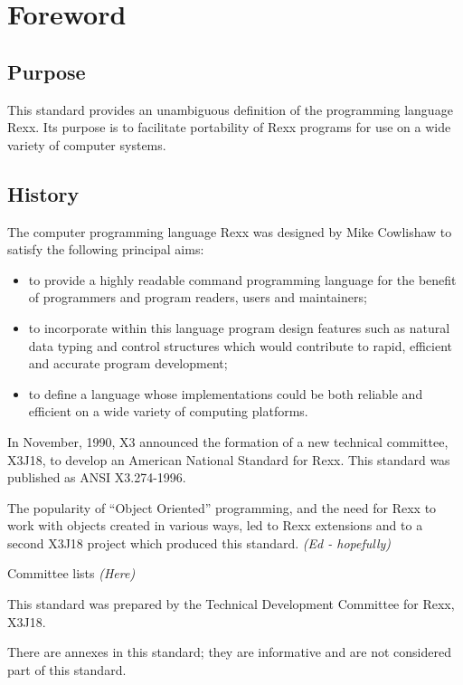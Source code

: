 \chapter{Foreword}\label{foreword}

\section{Purpose}\label{purpose}

This standard provides an unambiguous definition of the programming
language Rexx. Its purpose is to facilitate portability of Rexx programs
for use on a wide variety of computer systems.

\section{History}\label{history}

The computer programming language Rexx was designed by Mike Cowlishaw to
satisfy the following principal aims:

\begin{itemize}
\item
  to provide a highly readable command programming language for the
  benefit of programmers and program readers, users and maintainers;
\item
  to incorporate within this language program design features such as
  natural data typing and control structures which would contribute to
  rapid, efficient and accurate program development;
\item
  to define a language whose implementations could be both reliable and
  efficient on a wide variety of computing platforms.
\end{itemize}

In November, 1990, X3 announced the formation of a new technical
committee, X3J18, to develop an American National Standard for Rexx.
This standard was published as ANSI X3.274-1996.

The popularity of ``Object Oriented'' programming, and the need for Rexx
to work with objects created in various ways, led to Rexx extensions and
to a second X3J18 project which produced this standard. \emph{(Ed -
hopefully)}

Committee lists \emph{(Here)}

This standard was prepared by the Technical Development Committee for
Rexx, X3J18.

There are annexes in this standard; they are informative and are not
considered part of this standard.

